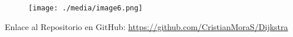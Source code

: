 \documentclass[12pt]{article}
\renewcommand{\_}{\kern-1.5pt\textunderscore\kern-1.5pt}
\begin{document}

\begin{figure}[H]
	\begin{Center}
		\texttt{[image: ./media/image6.png]}
	\end{Center}
\end{figure}



\par


\vspace{\baselineskip}
Enlace al Repositorio en GitHub: \href{https://github.com/CristianMoraS/Dijkstra}{https://github.com/CristianMoraS/Dijkstra}\par


\vspace{\baselineskip}

\printbibliography
\end{document}
